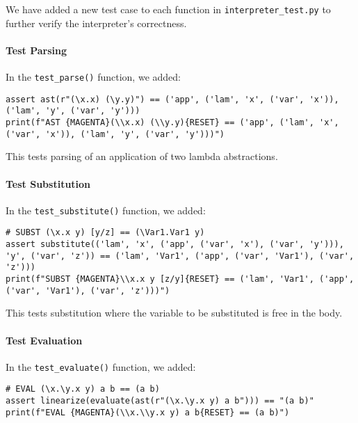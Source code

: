 We have added a new test case to each function in \texttt{interpreter\_test.py} to further verify the interpreter's correctness.

\paragraph{Test Parsing}

In the \texttt{test\_parse()} function, we added:

\begin{verbatim}
assert ast(r"(\x.x) (\y.y)") == ('app', ('lam', 'x', ('var', 'x')), ('lam', 'y', ('var', 'y')))
print(f"AST {MAGENTA}(\\x.x) (\\y.y){RESET} == ('app', ('lam', 'x', ('var', 'x')), ('lam', 'y', ('var', 'y')))")
\end{verbatim}

This tests parsing of an application of two lambda abstractions.

\paragraph{Test Substitution}

In the \texttt{test\_substitute()} function, we added:

\begin{verbatim}
# SUBST (\x.x y) [y/z] == (\Var1.Var1 y)
assert substitute(('lam', 'x', ('app', ('var', 'x'), ('var', 'y'))), 'y', ('var', 'z')) == ('lam', 'Var1', ('app', ('var', 'Var1'), ('var', 'z')))
print(f"SUBST {MAGENTA}\\x.x y [z/y]{RESET} == ('lam', 'Var1', ('app', ('var', 'Var1'), ('var', 'z')))")
\end{verbatim}

This tests substitution where the variable to be substituted is free in the body.

\paragraph{Test Evaluation}

In the \texttt{test\_evaluate()} function, we added:

\begin{verbatim}
# EVAL (\x.\y.x y) a b == (a b)
assert linearize(evaluate(ast(r"(\x.\y.x y) a b"))) == "(a b)"
print(f"EVAL {MAGENTA}(\\x.\\y.x y) a b{RESET} == (a b)")
\end{verbatim}

